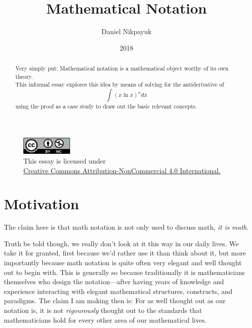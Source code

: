\documentclass[twoside]{article}
\title{Mathematical Notation}
\author{Daniel Nikpayuk}
\date{2018}
\begin{document}
\maketitle
\thispagestyle{empty}

\begin{figure}[h]
\centering
\includegraphics[width=1in]{cc-by-nc.png}\\[0.1in]
\tiny This essay is licensed under \\
\href{http://creativecommons.org/licenses/by-nc/4.0/}
{Creative Commons Attribution-NonCommercial 4.0 International.}\\[0.3in]
\end{figure}

\begin{abstract} %
Very simply put: Mathematical notation is a mathematical object worthy of its own theory.\\[0.1cm]

This informal essay explores this idea by means of solving for the antiderivative of
$$ \int (x\ln x)^n dx $$
using the proof as a case study to draw out the basic relevant concepts.
\end{abstract}

\section*{Motivation} %

The claim here is that math notation is not only used to discuss math, \emph{it is math}.

Truth be told though, we really don't look at it this way in our daily lives. We take it for granted, first because we'd rather
use it than think about it, but more importantly because math notation is quite often very elegant and well thought out to begin with.
This is generally so because traditionally it is mathematicians themselves who design the notation---after having years of knowledge
and experience interacting with elegant mathematical structures, constructs, and paradigms. The claim I am making then is:
For as well thought out as our notation is, it is not \emph{rigourously} thought out to the standards that mathematicians
hold for every other area of our mathematical lives.
\end{document}
